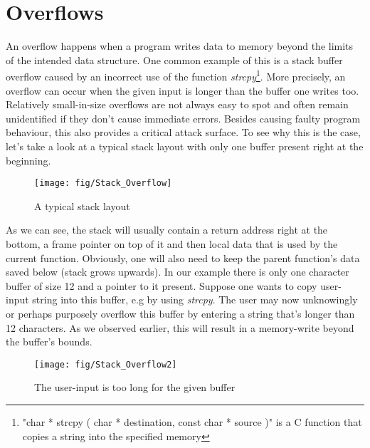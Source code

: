 \documentclass[10pt,twocolumn,a4paper]{article}
\begin{document}
\section{Overflows}\label{sec:Overflows}
An overflow happens when a program writes data to memory beyond the limits of the intended data structure.
One common example of this is a stack buffer overflow caused by an incorrect use of the function \emph{strcpy}\footnote{"char * strcpy ( char * destination, const char * source )" is a C function that copies a string into the specified memory}.
More precisely, an overflow can occur when the given input is longer than the buffer one writes too.
Relatively small-in-size overflows are not always easy to spot and often remain unidentified if they don't cause immediate errors.
Besides causing faulty program behaviour, this also provides a critical attack surface.
To see why this is the case, let's take a look at a typical stack layout with only one buffer present right at the beginning.
\begin{figure}[htbp]
	\begin{center}
		\texttt{[image: fig/Stack\_Overflow]}
		\caption{A typical stack layout}
	\end{center}
\end{figure}
\newline
As we can see, the stack will usually contain a return address right at the bottom, a frame pointer on top of it and then local data that is used by the current function.
Obviously, one will also need to keep the parent function's data saved below (stack grows upwards).
In our example there is only one character buffer of size 12 and a pointer to it present.
Suppose one wants to copy user-input string into this buffer, e.g by using \emph{strcpy}.
The user may now unknowingly or perhaps purposely overflow this buffer by entering a string that's longer than 12 characters.
As we observed earlier, this will result in a memory-write beyond the buffer's bounds. 
\begin{figure}[htbp]
	\begin{center}
		\texttt{[image: fig/Stack\_Overflow2]}
		\caption{The user-input is too long for the given buffer}
	\end{center}
\end{figure}
\newline 
\end{document}
